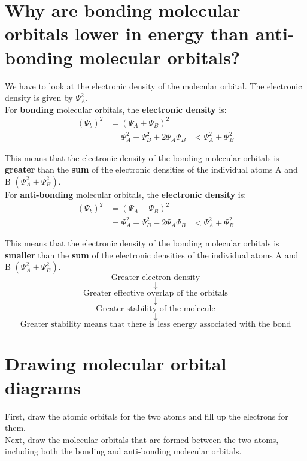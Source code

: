 \documentclass[11pt]{article}
\begin{document}
\newpage

\section{Why are bonding molecular orbitals lower in energy than anti-bonding molecular orbitals?}
\label{sec:orge6b8da6}
We have to look at the electronic density of the molecular orbital. The electronic density is given by \(\Psi_A^2\).
\\[0pt]

For \textbf{bonding} molecular orbitals, the \textbf{electronic density} is:
\begin{align*}
(\Psi_b)^2 &= (\Psi_A + \Psi_B)^2 \\
&= \Psi_A^2 + \Psi_B^2 + 2 \Psi_A \Psi_B
&< \Psi_A^2 + \Psi_B^2
\end{align*}

This means that the electronic density of the bonding molecular orbitals is \textbf{greater} than the \textbf{sum} of the electronic densities of the individual atoms A and B \((\Psi_A^2 + \Psi_B^2)\).
\\[0pt]

For \textbf{anti-bonding} molecular orbitals, the \textbf{electronic density} is:
\begin{align*}
(\Psi_b)^2 &= (\Psi_A - \Psi_B)^2 \\
&= \Psi_A^2 + \Psi_B^2 - 2 \Psi_A \Psi_B
&< \Psi_A^2 + \Psi_B^2
\end{align*}

This means that the electronic density of the bonding molecular orbitals is \textbf{smaller} than the \textbf{sum} of the electronic densities of the individual atoms A and B \((\Psi_A^2 + \Psi_B^2)\).
\\[0pt]

\[\text{Greater electron density}\]
\[\downarrow\]
\[\text{Greater effective overlap of the orbitals}\]
\[\downarrow\]
\[\text{Greater stability of the molecule}\]
\[\downarrow\]
\[\text{Greater stability means that there is less energy associated with the bond}\]

\section{Drawing molecular orbital diagrams}
\label{sec:orgb06b928}
First, draw the atomic orbitals for the two atoms and fill up the electrons for them.
\\[0pt]

Next, draw the molecular orbitals that are formed between the two atoms, including both the bonding and anti-bonding molecular orbitals.
\\[0pt]
\end{document}
